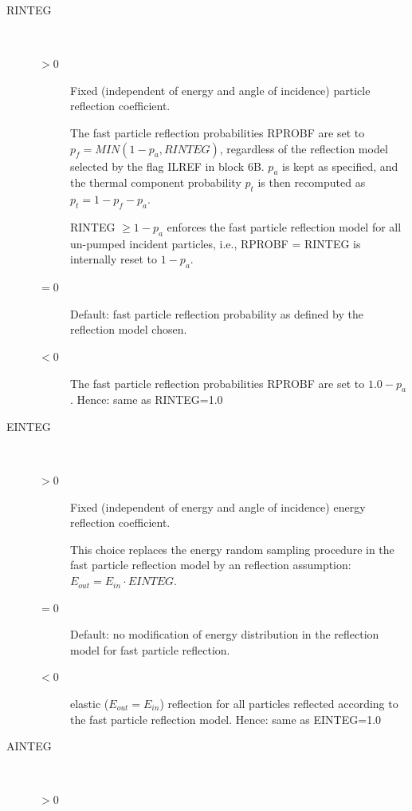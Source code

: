 \begin{description}
  \item[RINTEG] ~
        \begin{description}
          \item[$> 0$] Fixed (independent of energy
                and angle of incidence) particle reflection coefficient.

                The fast particle reflection probabilities RPROBF are set to $p_f = MIN(1 -
                  p_a, RINTEG)$, regardless of the reflection model selected by the flag ILREF in
                block 6B.
                $p_a$ is kept as specified, and the thermal component probability $p_t$ is then
                recomputed as $p_t = 1 - p_f - p_a$.

                RINTEG $\ge 1 - p_a$ enforces the fast particle reflection model for all
                un-pumped incident particles, i.e., RPROBF = RINTEG is internally reset to $1 -
                  p_a$.
          \item[$= 0$] Default: fast particle reflection probability as defined by the
                reflection model chosen.
          \item[$< 0$] The fast particle reflection probabilities RPROBF are set to
                $1.0-p_a$.
                Hence: same as RINTEG=1.0
        \end{description}

  \item[EINTEG] ~
        \begin{description}
          \item[$> 0$] Fixed (independent of energy
                and angle of incidence) energy reflection coefficient.

                This choice replaces the energy random sampling procedure in the fast particle
                reflection model by an reflection assumption:
                $E_{out} = E_{in} \cdot EINTEG$.

          \item[$= 0$] Default: no modification of energy distribution in the reflection
                model for fast particle reflection.
          \item[$< 0$] elastic ($E_{out} = E_{in}$) reflection for all particles
                reflected according to the fast particle reflection model.
                Hence: same as EINTEG=1.0
        \end{description}
  \item[AINTEG] ~
        \begin{description}
          \item[$> 0$] 


\end{description}
\end{description}
